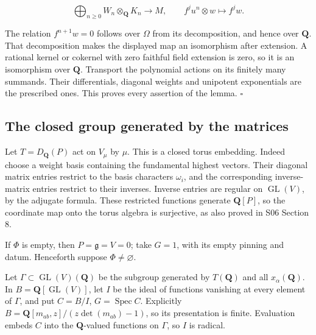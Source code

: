 \documentclass[11pt,a4paper,openany]{report}
\begin{document}
\[
\bigoplus_{n\ge0}W_n\otimes_{\mathbf Q}K_n\longrightarrow M,
\qquad f^ju^n\otimes w\longmapsto f^jw.
\]

The relation \(f^{n+1}w=0\) follows over \(\Omega\) from its decomposition, and hence over \(\mathbf Q\). That decomposition makes the displayed map an isomorphism after extension. A rational kernel or cokernel with zero faithful field extension is zero, so it is an isomorphism over \(\mathbf Q\). Transport the polynomial actions on its finitely many summands. Their differentials, diagonal weights and unipotent exponentials are the prescribed ones. This proves every assertion of the lemma. \(\square\)

\subsection{The closed group generated by the matrices}\label{AG-RG-05-the-closed-group-generated-by-the-matrices}

Let \(T=D_{\mathbf Q}(P)\) act on \(V_\mu\) by \(\mu\). This is a closed torus embedding. Indeed choose a weight basis containing the fundamental highest vectors. Their diagonal matrix entries restrict to the basis characters \(\omega_i\), and the corresponding inverse-matrix entries restrict to their inverses. Inverse entries are regular on \(\operatorname{GL}(V)\), by the adjugate formula. These restricted functions generate \(\mathbf Q[P]\), so the coordinate map onto the torus algebra is surjective, as also proved in S06 Section 8.

If \(\Phi\) is empty, then \(P=\mathfrak g=V=0\); take \(G=1\), with its empty pinning and datum. Henceforth suppose \(\Phi\ne\varnothing\).

Let \(\Gamma\subset\operatorname{GL}(V)(\mathbf Q)\) be the subgroup generated by \(T(\mathbf Q)\) and all \(x_\alpha(\mathbf Q)\). In \(B=\mathbf Q[\operatorname{GL}(V)]\), let \(I\) be the ideal of functions vanishing at every element of \(\Gamma\), and put \(C=B/I\), \(G=\operatorname{Spec}C\). Explicitly \(B=\mathbf Q[m_{ab},z]/(z\det(m_{ab})-1)\), so its presentation is finite. Evaluation embeds \(C\) into the \(\mathbf Q\)-valued functions on \(\Gamma\), so \(I\) is radical.
\end{document}
